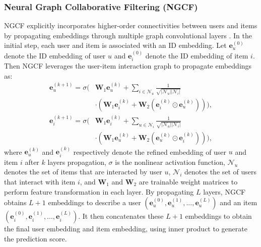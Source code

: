 \documentclass[sigconf,nonacm]{acmart} %
\begin{document}
\subsubsection{Neural Graph Collaborative Filtering (NGCF)} 
NGCF explicitly incorporates higher-order connectivities between users and items by propagating embeddings through multiple graph convolutional layers \cite{wang2019neural}.
In the initial step, each user and item is associated with an ID embedding. Let $\mathbf{e}_u^{(0)}$ denote the ID embedding of user $u$ and $\mathbf{e}_i^{(0)}$ denote the ID embedding of item $i$. Then NGCF leverages the user-item interaction graph to propagate embeddings as:  
\begin{equation}  
\begin{aligned}  
\mathbf{e}_u^{(k+1)} = \sigma\Big(&\mathbf{W}_1\mathbf{e}_u^{(k)} + \sum_{i\in\mathcal{N}_u} \frac{1}{\sqrt{|\mathcal{N}_u||\mathcal{N}_i|}}\\
&\cdot(\mathbf{W}_1\mathbf{e}_i^{(k)} + \mathbf{W}_2(\mathbf{e}_i^{(k)} \odot \mathbf{e}_u^{(k)}))\Big),  
\end{aligned}  
\label{eq:ngcf_user}  
\end{equation}  
\begin{equation}  
\begin{aligned}  
\mathbf{e}_i^{(k+1)} = \sigma\Big(&\mathbf{W}_1\mathbf{e}_i^{(k)} + \sum_{u\in\mathcal{N}_i} \frac{1}{\sqrt{|\mathcal{N}_u||\mathcal{N}_i|}}\\
&\cdot(\mathbf{W}_1\mathbf{e}_u^{(k)} + \mathbf{W}_2(\mathbf{e}_u^{(k)} \odot \mathbf{e}_i^{(k)}))\Big),  
\end{aligned}  
\label{eq:ngcf_item}  
\end{equation}  
where $\mathbf{e}_u^{(k)}$ and $\mathbf{e}_i^{(k)}$ respectively denote the refined embedding of user $u$ and item $i$ after $k$ layers propagation, $\sigma$ is the nonlinear activation function, $\mathcal{N}_u$ denotes the set of items that are interacted by user $u$, $\mathcal{N}_i$ denotes the set of users that interact with item $i$, and $\mathbf{W}_1$ and $\mathbf{W}_2$ are trainable weight matrices to perform feature transformation in each layer. By propagating $L$ layers, NGCF obtains $L + 1$ embeddings to describe a user $(\mathbf{e}_u^{(0)}, \mathbf{e}_u^{(1)}, ..., \mathbf{e}_u^{(L)})$ and an item $(\mathbf{e}_i^{(0)}, \mathbf{e}_i^{(1)}, ..., \mathbf{e}_i^{(L)})$. It then concatenates these $L + 1$ embeddings to obtain the final user embedding and item embedding, using inner product to generate the prediction score.  
\end{document}
